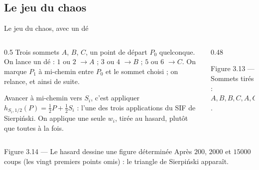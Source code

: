 \subsection{Le jeu du chaos}

\begin{frame}{Le jeu du chaos, avec un dé}
  \begin{columns}[c]
    \begin{column}{0.5\textwidth}
      \small Trois sommets $A$, $B$, $C$, un point de départ $P_0$
      quelconque. On lance un dé : $1$ ou $2$ $\to A$ ; $3$ ou $4$
      $\to B$ ; $5$ ou $6$ $\to C$. On marque $P_1$ à mi-chemin entre
      $P_0$ et le sommet choisi ; on relance, et ainsi de suite.
      \vspace{4pt}

      Avancer à mi-chemin vers $S_i$, c'est appliquer
      $h_{S_i,1/2}(P)=\tfrac12P+\tfrac12S_i$ : l'une des trois
      applications du SIF de Sierpiński. On applique une seule $w_i$,
      tirée au hasard, plutôt que toutes à la fois.
    \end{column}
    \begin{column}{0.48\textwidth}
      \begin{center}\scriptsize Figure 3.13 --- Sommets tirés :
      $A,B,B,C,A,C$.\end{center}
    \end{column}
  \end{columns}
\end{frame}

\begin{frame}{Figure 3.14 --- Le hasard dessine une figure déterminée}
  \small Après $200$, $\num{2000}$ et $\num{15000}$ coups (les vingt
  premiers points omis) : le triangle de Sierpiński apparaît.
\end{frame}

